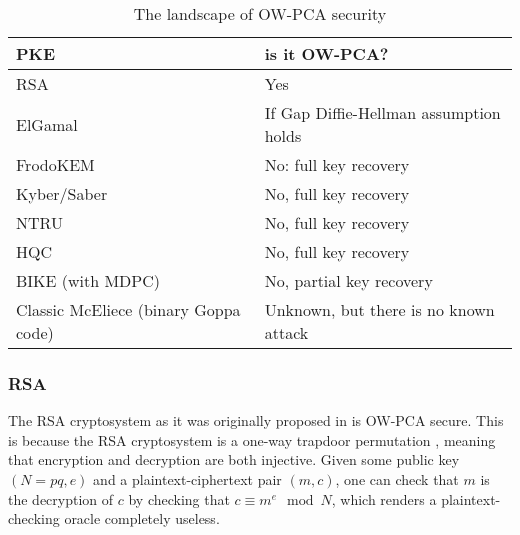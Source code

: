 \documentclass[runningheads]{llncs}
\begin{document}
\begin{table}
    \centering
    \begin{tabular}{|p{17em}|p{14em}|}
        \hline
        \centering\textbf{PKE} & \textbf{is it OW-PCA?} \\
        \hline
        RSA & Yes \cite{DBLP:conf/ima/Dent03,DBLP:journals/iacr/Shoup01}\\
        \hline
        ElGamal & If Gap Diffie-Hellman assumption holds \cite{DBLP:conf/ctrsa/AbdallaBR01,DBLP:conf/pkc/OkamotoP01}\\
        \hline
        FrodoKEM & No: full key recovery \cite{DBLP:conf/crypto/GuoJN20,DBLP:conf/eurocrypt/BaetuDHTV19} \\
        \hline
        Kyber/Saber & No, full key recovery \cite{DBLP:conf/acns/Huguenin-Dumittan20,DBLP:conf/asiacrypt/XagawaIUTH21,DBLP:conf/pqcrypto/GuoM23}\\
        \hline
        NTRU & No, full key recovery \cite{Hoffstein1999,DBLP:conf/crypto/JaulmesJ00,DBLP:journals/tches/UenoXTITH22} \\
        \hline
        HQC & No, full key recovery \cite{DBLP:conf/acns/Huguenin-Dumittan20,DBLP:conf/eurocrypt/BaetuDHTV19}\\
        \hline
        BIKE (with MDPC) & No, partial key recovery \cite{DBLP:conf/asiacrypt/Guo0S16} \\
        \hline
        Classic McEliece (binary Goppa code) & Unknown, but there is no known attack \cite{DBLP:journals/tches/UenoXTITH22}\\
        \hline
        
    \end{tabular}
    \caption{The landscape of OW-PCA security}\label{tbl:ow-pca-candidates}
\end{table}

\subsubsection{RSA} The RSA cryptosystem as it was originally proposed in \cite{DBLP:journals/cacm/RivestSA78} is OW-PCA secure. This is because the RSA cryptosystem is a one-way trapdoor permutation \cite{DBLP:conf/crypto/FujisakiOPS01}, meaning that encryption and decryption are both injective. Given some public key $(N=pq, e)$ and a plaintext-ciphertext pair $(m, c)$, one can check that $m$ is the decryption of $c$ by checking that $c \equiv m^e \mod N$, which renders a plaintext-checking oracle completely useless.
\end{document}
